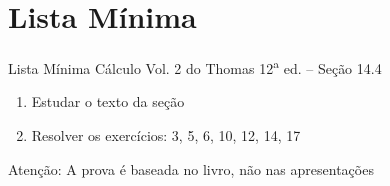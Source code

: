 \section{Lista Mínima}

\begin{frame}{Lista Mínima}
  Cálculo Vol. 2 do Thomas 12\textsuperscript{a} ed. -- Seção 14.4
  \begin{enumerate}
    \item Estudar o texto da seção
    \item Resolver os exercícios: 3, 5, 6, 10, 12, 14, 17
  \end{enumerate}

  \vfill
  Atenção: A prova é baseada no livro, não nas apresentações
\end{frame}


